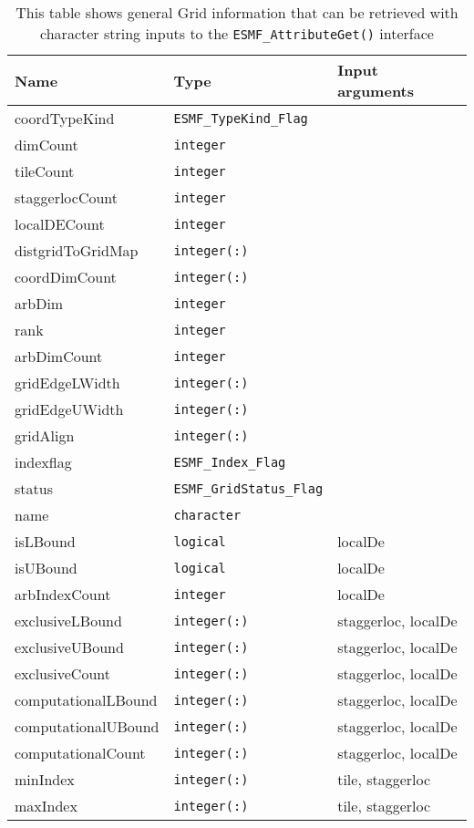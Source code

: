 \begin{table}[h!p!b!]
  \caption{This table shows general Grid information that can be retrieved with character string inputs to the {\tt ESMF\_AttributeGet()} interface}
  \begin{tabular}{|l|l|l|}
    \hline
    {\bf Name} & {\bf Type} & {\bf Input arguments}\\
    \hline
    coordTypeKind & {\tt ESMF\_TypeKind\_Flag} & \\
    dimCount & {\tt integer} & \\
    tileCount & {\tt integer} & \\
    staggerlocCount & {\tt integer} & \\
    localDECount & {\tt integer} & \\
    distgridToGridMap & {\tt integer(:)} & \\
    coordDimCount & {\tt integer(:)} & \\
    arbDim & {\tt integer} & \\
    rank & {\tt integer} & \\
    arbDimCount & {\tt integer} & \\
    gridEdgeLWidth & {\tt integer(:)} & \\
    gridEdgeUWidth & {\tt integer(:)} & \\
    gridAlign & {\tt integer(:)} & \\
    indexflag & {\tt ESMF\_Index\_Flag} & \\
    status & {\tt ESMF\_GridStatus\_Flag} & \\
    name & {\tt character} & \\
    isLBound & {\tt logical} & localDe\\
    isUBound & {\tt logical} & localDe\\
    arbIndexCount & {\tt integer} & localDe\\
    exclusiveLBound & {\tt integer(:)} & staggerloc, localDe\\
    exclusiveUBound & {\tt integer(:)} & staggerloc, localDe\\
    exclusiveCount & {\tt integer(:)} & staggerloc, localDe\\
    computationalLBound & {\tt integer(:)} & staggerloc, localDe\\
    computationalUBound & {\tt integer(:)} & staggerloc, localDe\\
    computationalCount & {\tt integer(:)} & staggerloc, localDe\\
    minIndex & {\tt integer(:)} & tile, staggerloc\\
    maxIndex & {\tt integer(:)} & tile, staggerloc\\
    \hline
  \end{tabular}
  \label{AttributeInternalInfo-Get}
\end{table}

